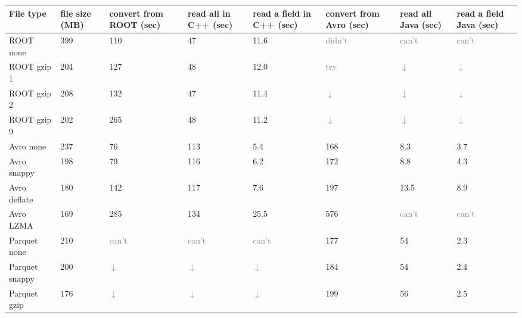 \documentclass{article}
\begin{document}
\noindent\begin{tabular}{p{2.4 cm} | P{1.2 cm} P{1.9 cm} P{1.2 cm} P{1.8 cm} P{1.9 cm} P{1.2 cm} P{1.5 cm}}
File type & file size (MB) & convert from ROOT (sec) & read all in C++ (sec) & read a field in C++ (sec) & convert from Avro (sec) & read all Java (sec) & read a field Java (sec)      \\\hline
ROOT none     & 399 &          110 &           47 &         11.6 &       \textcolor{gray}{didn't} &        \textcolor{gray}{can't} &        \textcolor{gray}{can't} \\
ROOT gzip 1   & 204 &          127 &           48 &         12.0 &          \textcolor{gray}{try} & \textcolor{gray}{$\downarrow$} & \textcolor{gray}{$\downarrow$} \\
ROOT gzip 2   & 208 &          132 &           47 &         11.4 & \textcolor{gray}{$\downarrow$} & \textcolor{gray}{$\downarrow$} & \textcolor{gray}{$\downarrow$} \\
ROOT gzip 9   & 202 &          265 &           48 &         11.2 & \textcolor{gray}{$\downarrow$} & \textcolor{gray}{$\downarrow$} & \textcolor{gray}{$\downarrow$} \\\hline
Avro none     & 237 &           76 &          113 &          5.4 &          168 &          8.3 &          3.7 \\
Avro snappy   & 198 &           79 &          116 &          6.2 &          172 &          8.8 &          4.3 \\
Avro deflate  & 180 &          142 &          117 &          7.6 &          197 &         13.5 &          8.9 \\
Avro LZMA     & 169 &          285 &          134 &         25.5 &          576 &        \textcolor{gray}{can't} &        \textcolor{gray}{can't} \\\hline
Parquet none  & 210 &        \textcolor{gray}{can't} &        \textcolor{gray}{can't} &        \textcolor{gray}{can't} &          177 &           54 &          2.3 \\
Parquet snappy  & 200 & \textcolor{gray}{$\downarrow$} & \textcolor{gray}{$\downarrow$} & \textcolor{gray}{$\downarrow$} &          184 &           54 &          2.4 \\
Parquet gzip  & 176 & \textcolor{gray}{$\downarrow$} & \textcolor{gray}{$\downarrow$} & \textcolor{gray}{$\downarrow$} &          199 &           56 &          2.5 \\
\end{tabular}
\end{document}
